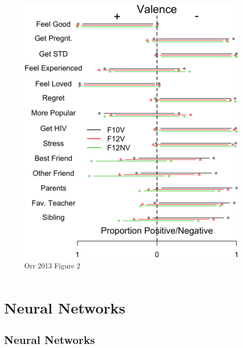 \documentclass[compress]{beamer}
\begin{document}
\begin{frame}[Basic2]
\begin{columns}
\begin{column}{0.5\linewidth}
                \begin{figure}
                    \centering
                    \includegraphics[height=0.7\textheight]{../figures/tra_example}
                    \caption{Orr 2013 Figure 2}
                \label{fig:traexample}
\end{figure}

            \end{column}
        \end{columns}
    \end{frame}

\section{Neural Networks}

\subsection{Neural Networks}
\end{document}
